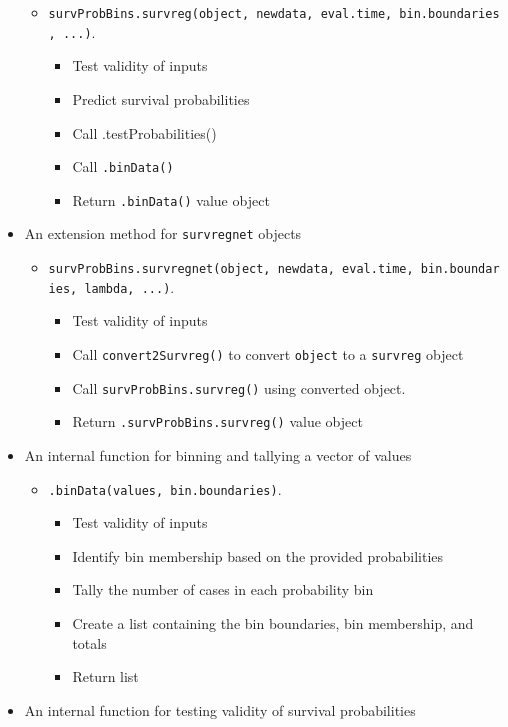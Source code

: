 \documentclass[
]{book}
\providecommand{\tightlist}{%
  \setlength{\itemsep}{0pt}\setlength{\parskip}{0pt}}
\begin{document}
\begin{itemize}
  \begin{itemize}
  \tightlist
  \item
    \texttt{survProbBins.survreg(object,\ newdata,\ eval.time,\ bin.boundaries,\ ...)}.

    \begin{itemize}
    \tightlist
    \item
      Test validity of inputs
    \item
      Predict survival probabilities
    \item
      Call .testProbabilities()
    \item
      Call \texttt{.binData()}
    \item
      Return \texttt{.binData()} value object
    \end{itemize}
  \end{itemize}
\item
  An extension method for \texttt{survregnet} objects

  \begin{itemize}
  \tightlist
  \item
    \texttt{survProbBins.survregnet(object,\ newdata,\ eval.time,\ bin.boundaries,\ lambda,\ ...)}.

    \begin{itemize}
    \tightlist
    \item
      Test validity of inputs
    \item
      Call \texttt{convert2Survreg()} to convert \texttt{object} to a \texttt{survreg} object
    \item
      Call \texttt{survProbBins.survreg()} using converted object.
    \item
      Return \texttt{.survProbBins.survreg()} value object
    \end{itemize}
  \end{itemize}
\item
  An internal function for binning and tallying a vector of values

  \begin{itemize}
  \tightlist
  \item
    \texttt{.binData(values,\ bin.boundaries)}.

    \begin{itemize}
    \tightlist
    \item
      Test validity of inputs
    \item
      Identify bin membership based on the provided probabilities
    \item
      Tally the number of cases in each probability bin
    \item
      Create a list containing the bin boundaries, bin membership, and totals
    \item
      Return list
    \end{itemize}
  \end{itemize}
\item
  An internal function for testing validity of survival probabilities


\end{itemize}
\end{document}
